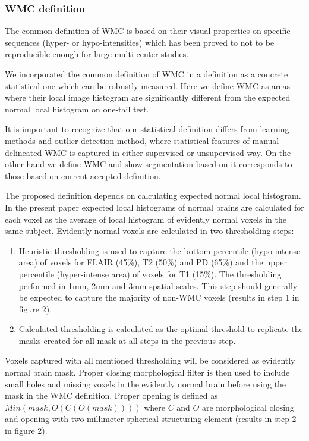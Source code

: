 \subsubsection{WMC definition}
The common definition of WMC is based on their visual properties on specific sequences (hyper- or hypo-intensities) which has been proved to not to be reproducible enough for large multi-center studies. 
\par
We incorporated the common definition of WMC in a definition as a concrete statistical one which can be robustly measured. Here we  define WMC as areas where their local image histogram are significantly different from the expected normal local histogram on one-tail test.
\par
It is important to recognize that our statistical definition differs from learning methods and outlier detection method, where statistical features of manual delineated WMC is captured in either supervised or unsupervised way.
On the other hand we define WMC and show segmentation based on it corresponds to those based on current accepted definition.
\par
The proposed definition depends on calculating expected normal local histogram. In the present paper expected local histograms of normal brains are calculated for each voxel as the average of local histogram of evidently normal voxels in the same subject. Evidently normal voxels are calculated in two thresholding steps:
\begin{enumerate}
\item Heuristic thresholding is used to capture the bottom percentile (hypo-intense area) of voxels for FLAIR (45\%), T2 (50\%) and PD (65\%) and the upper percentile (hyper-intense area) of voxels for T1 (15\%). The thresholding performed in 1mm, 2mm and 3mm spatial scales. This step should generally be expected to capture the majority of non-WMC voxels (results in step 1 in figure 2).
\item Calculated thresholding is calculated as the optimal threshold \cite{ReduceSVM} to replicate the masks created for all mask at all steps in the previous step.
\end{enumerate}
Voxels captured with all mentioned thresholding will be considered as evidently normal brain mask. Proper closing morphological filter is then used to include small holes and missing voxels in the evidently normal brain before using the mask in the WMC definition. Proper opening is defined as $ Min(mask,O( C( O( mask )))  ) $ where $ C $ and $ O $ are morphological closing and opening with two-millimeter spherical structuring element (results in step 2 in figure 2).

    
    
    
    
    
    
    
    
    
  
  
  
  
  
  